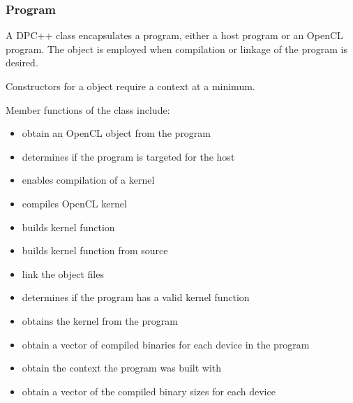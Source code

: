 \documentclass[letterpaper,10pt,english]{sphinxmanual}
\begin{document}
\subsubsection{Program}
\label{\detokenize{programming-interface/parallelism/program:program}}\label{\detokenize{programming-interface/parallelism/program:id1}}\label{\detokenize{programming-interface/parallelism/program::doc}}
A DPC++  class encapsulates a program, either a host program
or an OpenCL program. The  object is employed when
compilation or linkage of the program is desired.

Constructors for a  object require a context at a minimum.

Member functions of the  class include:
\begin{itemize}
\item {} 
 \textendash{} obtain an OpenCL  object from the program

\item {} 
 \textendash{} determines if the program is targeted for the host

\item {} 
 \textendash{} enables compilation of a kernel

\item {} 
 \textendash{} compiles OpenCL kernel

\item {} 
 \textendash{} builds kernel function

\item {} 
 \textendash{} builds kernel function from source

\item {} 
 \textendash{} link the object files

\item {} 
 \textendash{} determines if the program has a valid kernel
function

\item {} 
 \textendash{} obtains the kernel from the program

\item {} 
 \textendash{} obtain a vector of compiled binaries for each
device in the program

\item {} 
 \textendash{} obtain the context the program was built with

\item {} 
 \textendash{} obtain a vector of the compiled binary sizes for
each device

\end{itemize}
\end{document}
